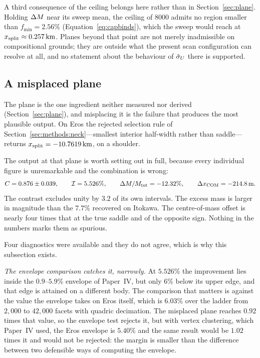 A third consequence of the ceiling belongs here rather than in
Section~\ref{sec:plane}. Holding $\Delta M$ near its sweep mean, the ceiling
of $8000$ admits no region smaller than $f_{\min} = 2.56\%$
(Equation~\eqref{eq:capbinds}), which the sweep would reach at
$x_{\mathrm{split}} \approx \SI{0.257}{\kilo\metre}$. Planes beyond that point are
not merely inadmissible on compositional grounds; they are outside what
the present scan configuration can resolve at all, and no statement about
the behaviour of $\tilde{\sigma}_{U}$ there is supported.

\subsection{A misplaced plane}
\label{sec:failures:plane}

The plane is the one ingredient neither measured nor derived
(Section~\ref{sec:plane}), and misplacing it is the failure that produces
the most plausible output. On Eros the rejected selection rule of
Section~\ref{sec:methods:neck}---smallest interior half-width rather than
saddle---returns $x_{\mathrm{split}} = \SI{-10.7619}{\kilo\metre}$, on a shoulder.

The output at that plane is worth setting out in full, because every
individual figure is unremarkable and the combination is wrong:
%
\begin{equation}
C = 0.876 \pm 0.039, \qquad
\mathcal{I} = 5.526\%, \qquad
\Delta M/M_{\mathrm{tot}} = -12.32\%, \qquad
\Delta x_{\mathrm{COM}} = \SI{-214.8}{\metre} .
\label{eq:misplaced}
\end{equation}
%
The contrast excludes unity by $3.2$ of its own intervals. The excess mass
is larger in magnitude than the $7.7\%$ recovered on Itokawa. The
centre-of-mass offset is nearly four times that at the true saddle and of
the opposite sign. Nothing in the numbers marks them as spurious.

Four diagnostics were available and they do not agree, which is why this
subsection exists.

\emph{The envelope comparison catches it, narrowly.} At $5.526\%$ the
improvement lies inside the $0.9$--$5.9\%$ envelope of Paper~IV, but only
$6\%$ below its upper edge, and that edge is attained on a different body.
The comparison that matters is against the value the envelope takes on
Eros itself, which is $6.03\%$ over the ladder from $2{,}000$ to $42{,}000$
facets with quadric decimation. The misplaced plane reaches $0.92$ times that
value, so the envelope test rejects it, but with vertex clustering, which
Paper~IV used, the Eros envelope is $5.40\%$ and the same result would be
$1.02$ times it and would not be rejected: the margin is smaller than the
difference between two defensible ways of computing the envelope.

